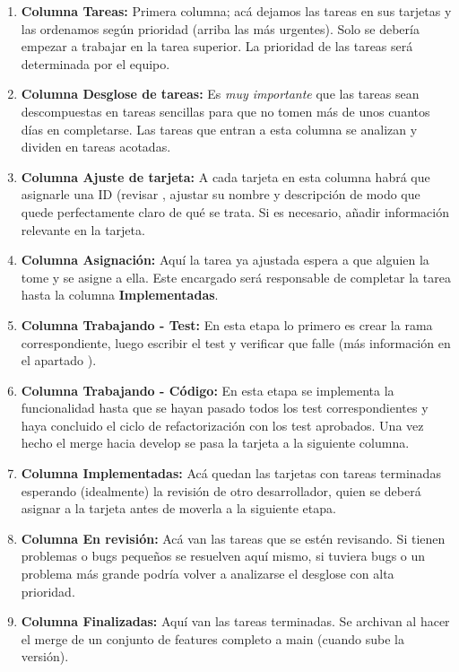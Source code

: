 \begin{enumerate}
	\item \textbf{Columna Tareas:} Primera columna; acá dejamos las tareas en sus tarjetas y las ordenamos según prioridad (arriba las más urgentes). Solo se debería empezar a trabajar en la tarea superior. La prioridad de las tareas será determinada por el equipo.
	
	\item \textbf{Columna Desglose de tareas:} Es \textit{muy importante} que las tareas sean descompuestas en tareas sencillas para que no tomen más de unos cuantos días en completarse. Las tareas que entran a esta columna se analizan y dividen en tareas acotadas.
	
	\item \textbf{Columna Ajuste de tarjeta:} A cada tarjeta en esta columna habrá que asignarle una ID (revisar , ajustar su nombre y descripción de modo que quede perfectamente claro de qué se trata. Si es necesario, añadir información relevante en la tarjeta.

	\item \textbf{Columna Asignación:} Aquí la tarea ya ajustada espera a que alguien la tome y se asigne a ella. Este encargado será responsable de completar la tarea hasta la columna \textbf{Implementadas}.
	
	\item \textbf{Columna Trabajando - Test:} En esta etapa lo primero es crear la rama correspondiente, luego escribir el test y verificar que falle (más información en el apartado ).
	
	\item \textbf{Columna Trabajando - Código:} En esta etapa se implementa la funcionalidad hasta que se hayan pasado todos los test correspondientes y haya concluido el ciclo de refactorización con los test aprobados. Una vez hecho el merge hacia develop se pasa la tarjeta a la siguiente columna.
	
	\item \textbf{Columna Implementadas:} Acá quedan las tarjetas con tareas terminadas esperando (idealmente) la revisión de otro desarrollador, quien se deberá asignar a la tarjeta antes de moverla a la siguiente etapa.
	
	\item \textbf{Columna En revisión:} Acá van las tareas que se estén revisando. Si tienen problemas o bugs pequeños se resuelven aquí mismo, si tuviera bugs o un problema más grande podría volver a analizarse el desglose con alta prioridad.
	
	\item \textbf{Columna Finalizadas:} Aquí van las tareas terminadas. Se archivan al hacer el merge de un conjunto de features completo a main (cuando sube la versión).
\end{enumerate}

